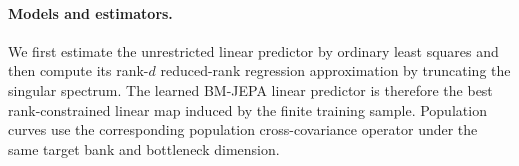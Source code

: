 
\paragraph{Models and estimators.}
We first estimate the unrestricted linear predictor by ordinary least squares
and then compute its rank-$d$ reduced-rank regression approximation by
truncating the singular spectrum. The learned BM-JEPA linear predictor is
therefore the best rank-constrained linear map induced by the finite training
sample. Population curves use the corresponding population cross-covariance
operator under the same target bank and bottleneck dimension.

